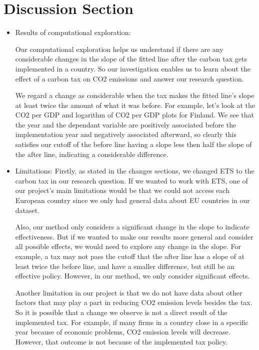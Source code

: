 \documentclass[fontsize=11pt]{article}
\begin{document}
\section*{Discussion Section}
\begin{itemize}
\item Results of computational exploration:

Our computational exploration helps us understand if there are any considerable changes in the slope of the fitted line after the carbon tax gets implemented in a country. So our investigation enables us to learn about the effect of a carbon tax on CO2 emissions and answer our research question.

We regard a change as considerable when the tax makes the fitted line's slope at least twice the amount of what it was before. For example, let's look at the CO2 per GDP and logarithm of CO2 per GDP plots for Finland. We see that the year and the dependant variable are positively associated before the implementation year and negatively associated afterward, so clearly this satisfies our cutoff of the before line having a slope less then half the slope of the after line, indicating a considerable difference.

\item Limitations:
Firstly, as stated in the changes sections, we changed ETS to the carbon tax in our research question. If we wanted to work with ETS, one of our project's main limitations would be that we could not access each European country since we only had general data about EU countries in our dataset.

Also, our method only considers a significant change in the slope to indicate effectiveness. But if we wanted to make our results more general and consider all possible effects, we would need to explore any change in the slope.
For example, a tax may not pass the cutoff that the after line has a slope of at least twice the before line, and have a smaller difference, but still be an effective policy. However, in our method, we only consider significant effects.

Another limitation in our project is that we do not have data about other factors that may play a part in reducing CO2 emission levels besides the tax. So it is possible that a change we observe is not a direct result of the implemented tax. For example, if many firms in a country close in a specific year because of economic problems, CO2 emission levels will decrease. However, that outcome is not because of the implemented tax policy.\\



\end{itemize}
\end{document}
